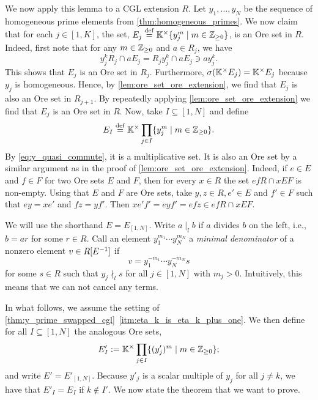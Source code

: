 We now apply this lemma to a CGL extension $R$. Let $y_1, \dots, y_N$ be the sequence
of homogeneous prime elements from \cref{thm:homogeneous_primes}. We now claim that for
each $j \in [1, K]$, the set, $E_j \overset{\mathrm{def}}{=} \mathbb{K}^\times\{y_j^{m} \mid m \in \mathbb{Z}_{\geq
		0}\}$, is an Ore set in $R$. Indeed, first note that for any $m \in \mathbb{Z}_{\geq 0}$ and
$a \in R_j$, we have
\begin{equation*}
	y_j^k R_j \cap a E_j = R_j y_j^k \cap  a E_j \ni a y_j^k.
\end{equation*}
%
This shows that $E_j$ is an Ore set in $R_j$. Furthermore, $\sigma(\mathbb{K}^\times E_j) =
	\mathbb{K}^\times E_j$ because $y_j$ is homogeneous. Hence, by
\cref{lem:ore_set_ore_extension}, we find that $E_j$ is also an Ore set in $R_{j + 1}$.
By repeatedly applying \cref{lem:ore_set_ore_extension} we find that $E_j$ is an Ore
set in $R$. Now, take $I \subseteq [1, N]$ and define
\begin{equation*}
	E_I \overset{\mathrm{def}}{=} \mathbb{K}^\times \prod_{j \in I}\{y_j^m \mid m \in \mathbb{Z}_{\geq 0}\}.
\end{equation*}
%
%
By \cref{eq:y_quasi_commute}, it is a multiplicative set. It is also an Ore set by a
similar argument as in the proof of \cref{lem:ore_set_ore_extension}. Indeed, if $e \in
	E$ and $f \in F$ for two Ore sets $E$ and $F$, then for every $x \in R$ the set $ef R
	\cap x E F$ is non-empty. Using that $E$ and $F$ are Ore sets, take $y, z \in R, e' \in
	E$ and $f' \in F$ such that $ey = xe'$ and $fz = yf'$. Then $xe'f' = eyf' = efz \in efR
	\cap xEF$.

We will use the shorthand $E = E_{[1,N]}$. Write $a \mid_l b$ if $a$ divides $b$ on the left, i.e., $b = ar$ for some $r \in R$. Call
an element $y_1^{m_1}\cdots y_N^{m_N}$ a \emph{minimal denominator} of a nonzero element $v\in R[E^{-1}]$ if
\begin{equation*}
	v = y_1^{-m_1}\cdots y_N^{-m_N} s
\end{equation*}
%
for some $s \in R$ such that $y_j \nmid_l s$ for all $j\in [1,N]$ with $m_j > 0$.
Intuitively, this means that we can not cancel any terms.

In what follows, we assume the setting of
\cref{thm:y_prime_swapped_cgl}~\ref*{itm:eta_k_is_eta_k_plus_one}. We then define for
all $I \subseteq [1, N]$ the analogous Ore sets,
\begin{equation*}
	E'_{I} := \mathbb{K}^\times \prod_{j \in I}\{(y'_j)^m \mid m \in \mathbb{Z}_{\geq 0}\};
\end{equation*}
%
and write $E' = E'_{[1, N]}$. Because $y'_j$ is a scalar multiple of $y_j$ for all $j
	\neq k$, we have that $E'_I = E_I$ if $k \notin I'$. We now state the theorem that we
want to prove.


